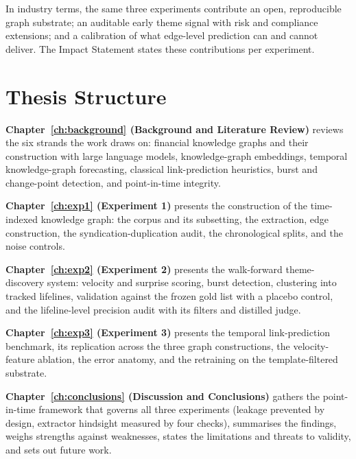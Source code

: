 \documentclass[a4paper,12pt]{report}
\begin{document}
In industry terms, the same three experiments contribute an open,
reproducible graph substrate; an auditable early theme signal with risk
and compliance extensions; and a calibration of what edge-level
prediction can and cannot deliver. The Impact Statement states these
contributions per experiment.

\section{Thesis Structure}
\label{sec:structure}
\textbf{Chapter~\ref{ch:background} (Background and Literature Review)}
reviews the six strands the work draws on: financial knowledge graphs
and their construction with large language models, knowledge-graph
embeddings, temporal knowledge-graph forecasting, classical
link-prediction heuristics, burst and change-point detection, and
point-in-time integrity.

\textbf{Chapter~\ref{ch:exp1} (Experiment 1)} presents the construction
of the time-indexed knowledge graph: the corpus and its subsetting, the
extraction, edge construction, the syndication-duplication audit, the
chronological splits, and the noise controls.

\textbf{Chapter~\ref{ch:exp2} (Experiment 2)} presents the walk-forward
theme-discovery system: velocity and surprise scoring, burst detection,
clustering into tracked lifelines, validation against the frozen gold
list with a placebo control, and the lifeline-level precision audit
with its filters and distilled judge.

\textbf{Chapter~\ref{ch:exp3} (Experiment 3)} presents the temporal
link-prediction benchmark, its replication across the three graph
constructions, the velocity-feature ablation, the error anatomy, and
the retraining on the template-filtered substrate.

\textbf{Chapter~\ref{ch:conclusions} (Discussion and Conclusions)}
gathers the point-in-time framework that governs all three experiments
(leakage prevented by design, extractor hindsight measured by four
checks), summarises the findings, weighs strengths against weaknesses,
states the limitations and threats to validity, and sets out future
work.

\end{document}
